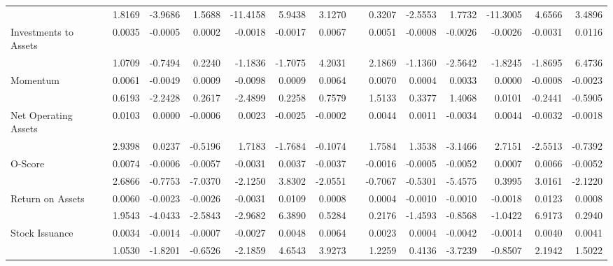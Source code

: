 \begin{table}[h]
{\begin{tabular}{lrrrrrrrrrrrrr}
& 1.8169 & -3.9686 & 1.5688 & -11.4158 & 5.9438 & 3.1270 &       & 0.3207 & -2.5553 & 1.7732 & -11.3005 & 4.6566 & 3.4896 \\
Investments to Assets & 0.0035 & -0.0005 & 0.0002 & -0.0018 & -0.0017 & 0.0067 &       & 0.0051 & -0.0008 & -0.0026 & -0.0026 & -0.0031 & 0.0116 \\
& 1.0709 & -0.7494 & 0.2240 & -1.1836 & -1.7075 & 4.2031 &       & 2.1869 & -1.1360 & -2.5642 & -1.8245 & -1.8695 & 6.4736 \\
Momentum & 0.0061 & -0.0049 & 0.0009 & -0.0098 & 0.0009 & 0.0064 &       & 0.0070 & 0.0004 & 0.0033 & 0.0000 & -0.0008 & -0.0023 \\
& 0.6193 & -2.2428 & 0.2617 & -2.4899 & 0.2258 & 0.7579 &       & 1.5133 & 0.3377 & 1.4068 & 0.0101 & -0.2441 & -0.5905 \\
Net Operating Assets & 0.0103 & 0.0000 & -0.0006 & 0.0023 & -0.0025 & -0.0002 &       & 0.0044 & 0.0011 & -0.0034 & 0.0044 & -0.0032 & -0.0018 \\
& 2.9398 & 0.0237 & -0.5196 & 1.7183 & -1.7684 & -0.1074 &       & 1.7584 & 1.3538 & -3.1466 & 2.7151 & -2.5513 & -0.7392 \\
O-Score & 0.0074 & -0.0006 & -0.0057 & -0.0031 & 0.0037 & -0.0037 &       & -0.0016 & -0.0005 & -0.0052 & 0.0007 & 0.0066 & -0.0052 \\
& 2.6866 & -0.7753 & -7.0370 & -2.1250 & 3.8302 & -2.0551 &       & -0.7067 & -0.5301 & -5.4575 & 0.3995 & 3.0161 & -2.1220 \\
Return on Assets & 0.0060 & -0.0023 & -0.0026 & -0.0031 & 0.0109 & 0.0008 &       & 0.0004 & -0.0010 & -0.0010 & -0.0018 & 0.0123 & 0.0008 \\
& 1.9543 & -4.0433 & -2.5843 & -2.9682 & 6.3890 & 0.5284 &       & 0.2176 & -1.4593 & -0.8568 & -1.0422 & 6.9173 & 0.2940 \\
Stock Issuance & 0.0034 & -0.0014 & -0.0007 & -0.0027 & 0.0048 & 0.0064 &       & 0.0023 & 0.0004 & -0.0042 & -0.0014 & 0.0040 & 0.0041 \\
& 1.0530 & -1.8201 & -0.6526 & -2.1859 & 4.6543 & 3.9273 &       & 1.2259 & 0.4136 & -3.7239 & -0.8507 & 2.1942 & 1.5022 \\
\bottomrule
\end{tabular}%
}
\label{tab:vol-ff5}%
\end{table}%

